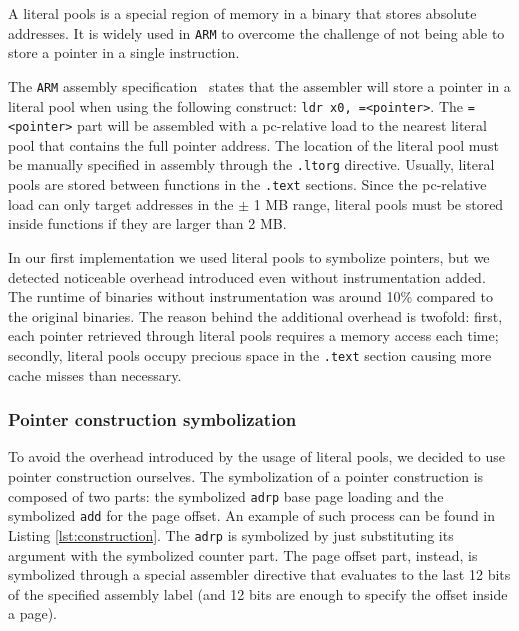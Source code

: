 \documentclass[a4paper,11pt,oneside]{report}
\begin{document}
A literal pools is a special region of memory in a binary that stores absolute
addresses. It is widely used in \texttt{ARM} to overcome the challenge of not
being able to store a pointer in a single instruction. 

The \texttt{ARM} assembly specification~\cite{literalpoolsarm} states that the
assembler will store a pointer in a literal pool when using the following
construct: \texttt{ldr x0, =<pointer>}.  The \texttt{=<pointer>} part will be
assembled with a pc-relative load to the nearest literal pool that contains the
full pointer address.  The location of the literal pool must be manually
specified in assembly through the \texttt{.ltorg} directive. Usually, literal
pools are stored between functions in the \texttt{.text} sections. Since the
pc-relative load can only target addresses in the $\pm$ 1 MB range, literal
pools must be stored inside functions if they are larger than 2 MB. 

In our first implementation we used literal pools to symbolize pointers, but we 
detected noticeable overhead introduced even without instrumentation added. The runtime
of binaries without instrumentation was around 10\% compared to the original binaries. 
The reason behind the additional overhead is twofold: first, each pointer retrieved through
literal pools requires a memory access each time; secondly, literal pools occupy precious
space in the \texttt{.text} section causing more cache misses than necessary. 


\subsubsection{Pointer construction symbolization}

To avoid the overhead introduced by the usage of literal pools, we decided to
use pointer construction ourselves. The symbolization of a pointer construction
is composed of two parts: the symbolized \texttt{adrp} base page loading and
the symbolized \texttt{add} for the page offset. An example of such process can
be found in Listing \ref{lst:construction}. The \texttt{adrp} is symbolized by just
substituting its argument with the symbolized counter part.  The page offset part,
instead, is symbolized through a special assembler directive that evaluates to the
last 12 bits of the specified assembly label (and 12 bits are enough to specify
the offset inside a page). 
\end{document}
